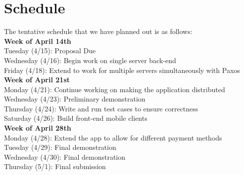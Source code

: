 \documentclass[12pt]{article}
\begin{document}
\section{Schedule}

The tentative schedule that we have planned out is as follows:\\

\textbf{Week of April 14th}\\
Tuesday (4/15): Proposal Due\\
Wednesday (4/16): Begin work on single server back-end\\
Friday (4/18): Extend to work for multiple servers simultaneously with Paxos\\

\textbf{Week of April 21st}\\
Monday (4/21): Continue working on making the application distributed\\
Wednesday (4/23): Preliminary demonstration\\
Thursday (4/24): Write and run test cases to ensure correctness\\
Saturday (4/26): Build front-end mobile clients\\

\textbf{Week of April 28th}\\
Monday (4/28): Extend the app to allow for different payment methods\\
Tuesday (4/29): Final demonstration\\
Wednesday (4/30): Final demonstration\\
Thursday (5/1): Final submission 
\end{document}
